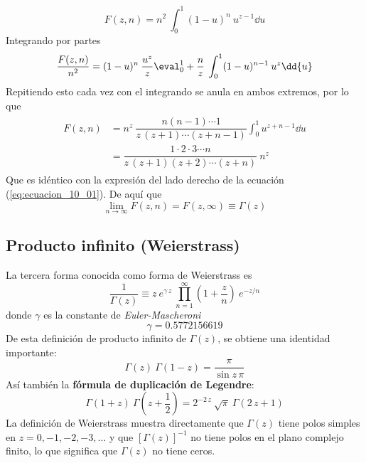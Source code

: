 \begin{equation}
F(z,n) = n^{2} \: \int_{0}^{1} (1-u)^{n} \: u^{z-1} \dd{u}
\label{eq:ecuacion_10_12}
\end{equation}
Integrando por partes
\begin{equation}
\dfrac{F(z, n)}{n^{2}} =  (1-u)^{n} \: \dfrac{u^{z}}{z} \eval_{0}^{1} + \dfrac{n}{z} \: \int_{0}^{1} (1-u)^{n-1} \: u^{z} \dd{u}
\label{eq:ecuacion_10_13}
\end{equation}
Repitiendo esto cada vez con el integrando se anula en ambos extremos, por lo que
\begin{align}
\begin{aligned}
F(z,n) &= n^{z} \: \dfrac{n(n-1) \cdots 1}{z \, (z+1) \cdots (z+n-1)} \int_{0}^{1} u^{z+n-1} \dd{u} \\[0.5em]
&= \dfrac{1 \cdot 2 \cdot 3 \cdots n}{z \, (z+1)(z+2) \cdots (z+n)} \: n^{z}
\label{eq:ecuacion_10_14}
\end{aligned}
\end{align}
Que es idéntico con la expresión del lado derecho de la ecuación (\ref{eq:ecuacion_10_01}). De aquí que
\begin{equation}
\lim_{n \to \infty} F(z, n) = F(z, \infty) \equiv \Gamma (z)
\label{eq:ecuacion_10_15}
\end{equation}
\subsection{Producto infinito (Weierstrass)}
La tercera forma conocida como forma de Weierstrass es
\begin{equation}
\dfrac{1}{\Gamma (z)} \equiv z \:  e^{\gamma \, z} \: \prod_{n=1}^{\infty} \left( 1 + \dfrac{z}{n} \right) \: e^{-z/n}
\label{eq:ecuacion_10_16}
\end{equation}
donde $\gamma$ es la constante de \emph{Euler-Mascheroni}
\begin{equation}
\gamma = 0.5772156619
\label{eq:ecuacion_10_17}
\end{equation}
De esta definición de producto infinito de $\Gamma (z)$, se obtiene una identidad importante:
\begin{equation}
\Gamma (z) \: \Gamma (1 - z) = \dfrac{\pi}{\sin z \, \pi}
\label{eq:ecuacion_10_23}
\end{equation}
Así también la \textbf{fórmula de duplicación de Legendre}:
\begin{equation}
\Gamma (1 + z) \: \Gamma (z + \frac{1}{2}) = 2^{-2 \, z} \: \sqrt{\pi} \: \Gamma (2 \, z + 1)
\label{eq:ecuacion_10_24b}
\end{equation}
La definición de Weierstrass muestra directamente que $\Gamma (z)$ tiene polos simples en $z = 0, -1, -2, -3, \ldots$ y que $[\Gamma (z)]^{-1}$ no tiene polos en el plano complejo finito, lo que significa que $\Gamma (z)$ no tiene ceros.
